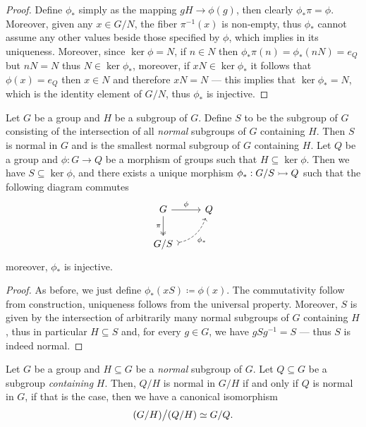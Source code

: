 \begin{proof}
Define \(\phi_{*}\) simply as the mapping \(gH \to \phi(g)\), then clearly
\(\phi_{*} \pi = \phi\). Moreover, given any \(x \in G/N\), the fiber
\(\pi^{-1}(x)\) is non-empty, thus \(\phi_{*}\) cannot assume any other values
beside those specified by \(\phi\), which implies in its uniqueness. Moreover,
since \(\ker \phi = N\), if \(n \in N\) then
\(\phi_{*} \pi(n) = \phi_{*}(n N) = e_{Q}\) but \(n N = N\) thus
\(N \in \ker \phi_{*}\), moreover, if \(x N \in \ker \phi_{*}\) it follows that
\(\phi(x) = e_Q\) then \(x \in N\) and therefore \(x N = N\) --- this implies
that \(\ker \phi_{*} = N\), which is the identity element of \(G/N\), thus
\(\phi_{*}\) is injective.
\end{proof}

\begin{corollary}
\label{cor:universal-property-quotients-grp}
Let \(G\) be a group and \(H\) be a subgroup of \(G\). Define \(S\) to be the
subgroup of \(G\) consisting of the intersection of all \emph{normal} subgroups
of \(G\) containing \(H\). Then \(S\) is normal in \(G\) and is the smallest
normal subgroup of \(G\) containing \(H\). Let \(Q\) be a group and \(\phi: G
\to Q\) be a morphism of groups such that \(H \subseteq \ker \phi\). Then we
have \(S \subseteq \ker \phi\), and there exists a unique morphism \(\phi_{*}:
G/S \rightarrowtail Q\) such that the following diagram commutes
\[
  \begin{tikzcd}
    G \ar[d, two heads, swap, "\pi"] \ar[r, "\phi"] &Q \\
    G/S \ar[ur, dashed, swap, bend right, tail, "\phi_{*}"] &
  \end{tikzcd}
\]
moreover, \(\phi_{*}\) is injective.
\end{corollary}

\begin{proof}
As before, we just define \(\phi_{*}(x S) \coloneq \phi(x)\). The commutativity
follow from construction, uniqueness follows from the universal
property. Moreover, \(S\) is given by the intersection of arbitrarily many
normal subgroups of \(G\) containing \(H\), thus in particular \(H \subseteq S\)
and, for every \(g \in G\), we have \(g S g^{-1} = S\) --- thus \(S\) is indeed
normal.
\end{proof}

\begin{corollary}
\label{cor:quotient-isomorphism}
Let \(G\) be a group and \(H \subseteq G\) be a \emph{normal} subgroup of
\(G\). Let \(Q \subseteq G\) be a subgroup \emph{containing} \(H\). Then,
\(Q/H\) is normal in \(G/H\) if and only if \(Q\) is normal in \(G\), if that is
the case, then we have a canonical isomorphism
\[
  (G/H) \big/ (Q/H) \simeq G/Q.
\]
\end{corollary}

